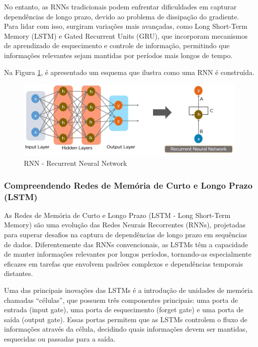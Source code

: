 No entanto, as RNNs tradicionais podem enfrentar dificuldades em capturar dependências de longo prazo, devido ao problema de dissipação do gradiente. Para lidar com isso, surgiram variações mais avançadas, como Long Short-Term Memory (LSTM) e Gated Recurrent Units (GRU), que incorporam mecanismos de aprendizado de esquecimento e controle de informação, permitindo que informações relevantes sejam mantidas por períodos mais longos de tempo.

Na Figura \ref{fig:8s40xcsn}, é apresentado um esquema que ilustra como uma RNN é construída.

\begin{figure}[!htpb]
	\centering
	\caption{RNN - Recurrent Neural Network}
	\label{fig:8s40xcsn}
	\includegraphics[width=1\linewidth]{Apendices/Figuras/modelagem-24h/8s40xcsn}
	
\end{figure}

\subsubsection{Compreendendo Redes de Mem\'oria de Curto e Longo Prazo (LSTM)}

As Redes de Memória de Curto e Longo Prazo (LSTM - Long Short-Term Memory) são uma evolução das Redes Neurais Recorrentes (RNNs), projetadas para superar desafios na captura de dependências de longo prazo em sequências de dados. Diferentemente das RNNs convencionais, as LSTMs têm a capacidade de manter informações relevantes por longos períodos, tornando-as especialmente eficazes em tarefas que envolvem padrões complexos e dependências temporais distantes.

Uma das principais inovações das LSTMs é a introdução de unidades de memória chamadas ``células'', que possuem três componentes principais: uma porta de entrada (input gate), uma porta de esquecimento (forget gate) e uma porta de saída (output gate). Essas portas permitem que as LSTMs controlem o fluxo de informações através da célula, decidindo quais informações devem ser mantidas, esquecidas ou passadas para a saída.

